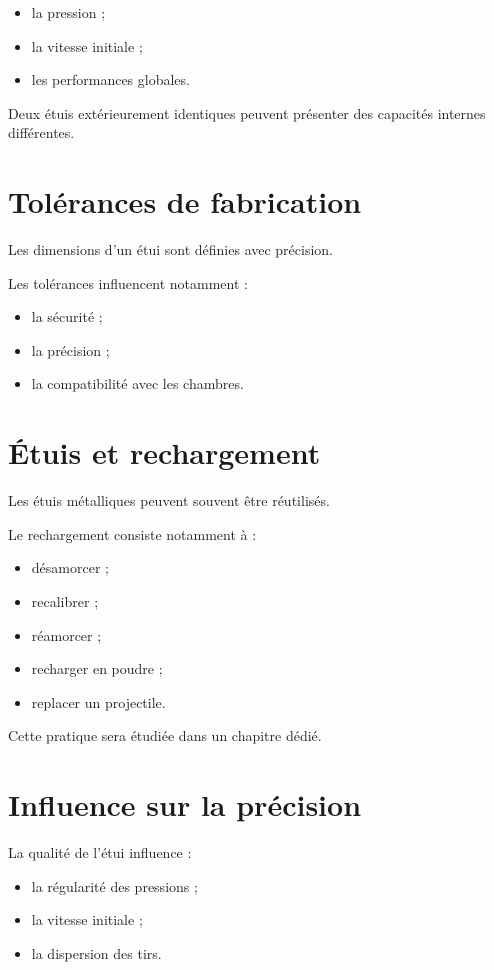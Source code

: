 \begin{itemize}
    \item la pression ;
    \item la vitesse initiale ;
    \item les performances globales.
\end{itemize}

Deux étuis extérieurement identiques peuvent présenter des capacités
internes différentes.

\section{Tolérances de fabrication}

Les dimensions d'un étui sont définies avec précision.

Les tolérances influencent notamment :

\begin{itemize}
    \item la sécurité ;
    \item la précision ;
    \item la compatibilité avec les chambres.
\end{itemize}

\section{Étuis et rechargement}

Les étuis métalliques peuvent souvent être réutilisés.

Le rechargement consiste notamment à :

\begin{itemize}
    \item désamorcer ;
    \item recalibrer ;
    \item réamorcer ;
    \item recharger en poudre ;
    \item replacer un projectile.
\end{itemize}

Cette pratique sera étudiée dans un chapitre dédié.

\section{Influence sur la précision}

La qualité de l'étui influence :

\begin{itemize}
    \item la régularité des pressions ;
    \item la vitesse initiale ;
    \item la dispersion des tirs.
\end{itemize}

